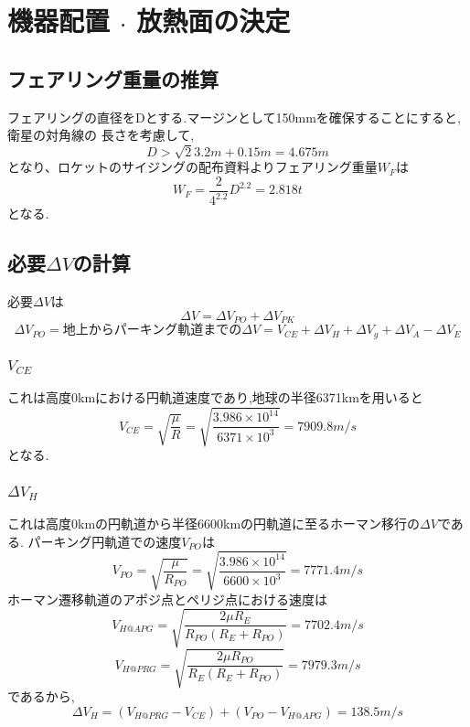 \documentclass[15pt,uplatex,dvipdfmx]{jsarticle}
\begin{document}
\setcounter{section}{6}

\section{機器配置 $\cdot$ 放熱面の決定}

\subsection{フェアリング重量の推算}
フェアリングの直径をDとする.マージンとして150mmを確保することにすると,衛星の対角線の
長さを考慮して,
\begin{equation}
  D > \sqrt{2}3.2m + 0.15m = 4.675m
\end{equation}
となり、ロケットのサイジングの配布資料よりフェアリング重量$W_F$は
\begin{equation}
  W_F = \frac{2}{4^{2.2}}D^{2.2} = 2.818t
\end{equation}
となる.

\subsection{必要$\Delta V$の計算}
必要$\Delta V$は
\begin{equation}
  \Delta V = \Delta V_{PO} + \Delta V_{PK}
\end{equation}
\begin{equation}
  \Delta V_{PO}= \text{地上からパーキング軌道までの$\Delta V$}
   =V_{CE} + \Delta V_H + \Delta V_g + \Delta V_A - \Delta V_E
\end{equation}
\subsubsection{$V_{CE}$}
これは高度0kmにおける円軌道速度であり,地球の半径6371kmを用いると
\begin{equation}
  V_{CE} = \sqrt{\frac{\mu}{R}}
  = \sqrt{\frac{3.986\times 10^{14}}{6371\times 10^3}}
   = 7909.8m/s
\end{equation}
となる.
\subsubsection{$\Delta V_H$}
これは高度0kmの円軌道から半径6600kmの円軌道に至るホーマン移行の$\Delta V$である.
パーキング円軌道での速度$V_{PO}$は
\begin{equation}
V_{PO} =  \sqrt{\frac{\mu}{R_{PO}}}
 = \sqrt{\frac{3.986\times 10^{14}}{6600\times 10^3}}
  = 7771.4m/s
\end{equation}
ホーマン遷移軌道のアポジ点とペリジ点における速度は
\begin{equation}
V_{H@APG} =  \sqrt{\frac{2\mu R_E}{R_{PO}(R_E+R_{PO})}}=7702.4m/s
\end{equation}
\begin{equation}
V_{H@PRG} =  \sqrt{\frac{2\mu R_{PO}}{R_E(R_E+R_{PO})}}=7979.3m/s
\end{equation}
であるから,
\begin{equation}
  \Delta V_H = (V_{H@PRG} - V_{CE}) + (V_{PO} -V_{H@APG}) =138.5m/s
\end{equation}
\end{document}
